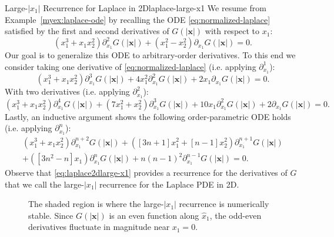 \documentclass[12pt]{article}
\let\b=\boldsymbol
\theoremstyle{definition}
\theoremstyle{plain}
\theoremstyle{definition}
\begin{document}
\begin{myexample}{Large-$|x_1|$ Recurrence for Laplace in 2D}{laplace-large-x1}
We resume from Example~\ref{myex:laplace-ode} by recalling the ODE \eqref{eq:normalized-laplace} satisfied by the first and second derivatives of $G(|\b{x}|)$ with respect to $x_1$:
\[
(x_1^3 + x_1 x_2^2)\partial^2_{x_1} G(|\b{x}|) + (x_1^2 - x_2^2) \partial_{x_1} G(|\b{x}|)  = 0.
\]
Our goal is to generalize this ODE to arbitrary-order derivatives. To this end we consider taking one derivative of \eqref{eq:normalized-laplace} (i.e. applying $\partial^1_{x_1}$):
\[
(x_1^3 + x_1 x_2^2)  \partial^3_{x_1} G(|\b{x}|) + 4x_1^2 \partial^2_{x_1} G(|\b{x}|) + 2x_1 \partial_{x_1} G(|\b{x}|) = 0.
\]
With two derivatives (i.e. applying $\partial^2_{x_1}$):
\[
(x_1^3 + x_1 x_2^2) \partial^4_{x_1} G(|\b{x}|) + (7x_1^2 + x_2^2) \partial^3_{x_1} G(|\b{x}|) + 10 x_1 \partial^2_{x_1} G(|\b{x}|) + 2 \partial_{x_1} G(|\b{x}|) = 0.
\]
Lastly, an inductive argument shows the following order-parametric ODE holds (i.e. applying $\partial^n_{x_1}$):
\begin{equation}
\label{eq:laplace2dlarge-x1}
\begin{aligned}
(x_1^3 + x_1 x_2^2) \partial^{n+2}_{x_1} G(|\b{x}|) + ([3n + 1] x_1^2 + [n-1] x_2^2) \partial^{n+1}_{x_1} G(|\b{x}|)\\ +([3n^2 - n] x_1)\partial^{n}_{x_1} G(|\b{x}|) + n(n-1)^2 \partial^{n-1}_{x_1} G(|\b{x}|)= 0.
\end{aligned}
\end{equation}
Observe that \eqref{eq:laplace2dlarge-x1}  provides a recurrence for the derivatives of $G$ that we call the large-$|x_1|$ recurrence for the Laplace PDE in 2D.
\end{myexample}

\begin{figure}[!ht]
\centering
{}

\caption{The shaded region is where the large-$|x_1|$ recurrence is numerically stable. Since $G(|\b{x}|)$ is an even function along $\hat{x}_1$, the odd-even derivatives fluctuate in magnitude near $x_1 = 0$.}
\label{fig:my_label}
\end{figure}
\end{document}
